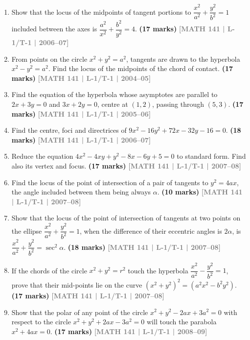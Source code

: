 \documentclass[12pt,a4paper]{article}
\newcommand{\yr}[1]{\hfill\textcolor{gray}{\small\textbf{[#1]}}}
\newcommand{\mk}[1]{\textcolor{orange!70!black}{\small\textbf{(#1 marks)}}}
\begin{document}
\begin{enumerate}
\item Show that the locus of the midpoints of tangent portions to $\dfrac{x^{2}}{a^{2}}+\dfrac{y^{2}}{b^{2}}=1$ included between the axes is $\dfrac{a^{2}}{x^{2}}+\dfrac{b^{2}}{y^{2}}=4$.
\mk{17} \yr{MATH 141 | L-1/T-1 | 2006--07}


\item From points on the circle $x^{2}+y^{2}=a^{2}$, tangents are drawn to the hyperbola $x^{2}-y^{2}=a^{2}$. Find the locus of the midpoints of the chord of contact.
\mk{17} \yr{MATH 141 | L-1/T-1 | 2004--05}

\item Find the equation of the hyperbola whose asymptotes are parallel to $2x+3y=0$ and $3x+2y=0$, centre at $(1,2)$, passing through $(5,3)$.
\mk{17} \yr{MATH 141 | L-1/T-1 | 2005--06}

\item Find the centre, foci and directrices of $9x^{2}-16y^{2}+72x-32y-16=0$.
\mk{18} \yr{MATH 141 | L-1/T-1 | 2006--07}

\item Reduce the equation $4x^{2}-4xy+y^{2}-8x-6y+5=0$ to standard form. Find also its vertex and focus.
\mk{17} \yr{MATH 141 | L-1/T-1 | 2007--08}

\item Find the locus of the point of intersection of a pair of tangents to $y^{2}=4ax$, the angle included between them being always $\alpha$.
\mk{10} \yr{MATH 141 | L-1/T-1 | 2007--08}

\item Show that the locus of the point of intersection of tangents at two points on the ellipse $\dfrac{x^{2}}{a^{2}}+\dfrac{y^{2}}{b^{2}}=1$, when the difference of their eccentric angles is $2\alpha$, is $\dfrac{x^{2}}{a^{2}}+\dfrac{y^{2}}{b^{2}}=\sec^{2}\alpha$.
\mk{18} \yr{MATH 141 | L-1/T-1 | 2007--08}

\item If the chords of the circle $x^{2}+y^{2}=r^{2}$ touch the hyperbola $\dfrac{x^{2}}{a^{2}}-\dfrac{y^{2}}{b^{2}}=1$, prove that their mid-points lie on the curve $(x^{2}+y^{2})^{2}=(a^{2}x^{2}-b^{2}y^{2})$.
\mk{17} \yr{MATH 141 | L-1/T-1 | 2007--08}

\item Show that the polar of any point of the circle $x^{2}+y^{2}-2ax+3a^{2}=0$ with respect to the circle $x^{2}+y^{2}+2ax-3a^{2}=0$ will touch the parabola $x^{2}+4ax=0$.
\mk{17} \yr{MATH 141 | L-1/T-1 | 2008--09}


\end{enumerate}
\end{document}
